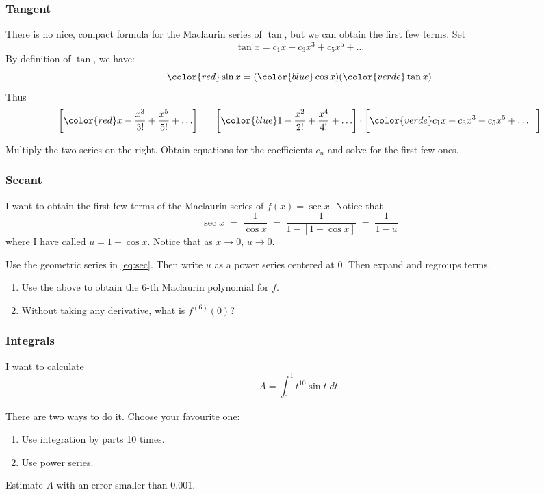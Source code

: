 \begin{frame}[t]
	\fontsize{13}{13}\selectfont
	\frametitle{Tangent}

	There is no nice, compact formula for the Maclaurin series of $\tan$, but we can
	obtain the first few terms. Set
	\[
		\tan x = c_{1}x + c_{3}x^{3}+ c_{5}x^{5}+ \ldots
	\]
	By definition of $\tan$, we have:
	\[
		{\color{red} \sin x}= ({\color{blue} \cos x}) ({\color{verde} \tan x})
	\]
	Thus
	{\fontsize{11}{11}\selectfont \[\left[{\color{red} x - \frac{x^{3}}{3!} + \frac{x^{5}}{5!} + \ldots}\right] \; = \; \left[{\color{blue} 1 - \frac{x^{2}}{2!} + \frac{x^{4}}{4!} + \ldots}\right] \cdot \left[{\color{verde} c_1 x + c_3 x^3 + c_5 x^5 + \ldots}\phantom{\frac{1}{1}}\right]\] }

	Multiply the two series on the right. Obtain equations for the coefficients
	$c_{n}$ and solve for the first few ones.
\end{frame}

\begin{frame}[t]
	\fontsize{13}{13}\selectfont
	\frametitle{Secant}

	I want to obtain the first few terms of the Maclaurin series of $\displaystyle
	f(x) = \sec x$. Notice that
	\begin{equation}
		\label{eq:sec}\sec x \; = \; \frac{1}{\cos x}\; = \; \frac{1}{1 - \left[ 1 -
		\cos x\right]}\; = \; \frac{1}{1-u}
	\end{equation}
	where I have called $\displaystyle u = 1 - \cos x$. \; Notice that as $x \to 0$,
	$u \to 0$.
	\vspace{.2cm}

	Use the geometric series in \eqref{eq:sec}. Then write $u$ as a power series
	centered at 0. Then expand and regroups terms.
	\vspace{.5cm}

	\begin{enumerate}
		\item Use the above to obtain the 6-th Maclaurin polynomial for $f$.

		\item Without taking any derivative, what is $\displaystyle f^{(6)}(0)$?
	\end{enumerate}
\end{frame}

\begin{frame}[t]
	\frametitle{Integrals}

	I want to calculate
	\[
		A = \int_{0}^{1}t^{10}\sin t \; dt.
	\]

	There are two ways to do it. Choose your favourite one:
	\begin{enumerate}
		\item Use integration by parts 10 times.

		\item Use power series.
	\end{enumerate}
	\hrulefill
	\vspace{.5cm}

	Estimate $A$ with an error smaller than $0.001$.
\end{frame}

